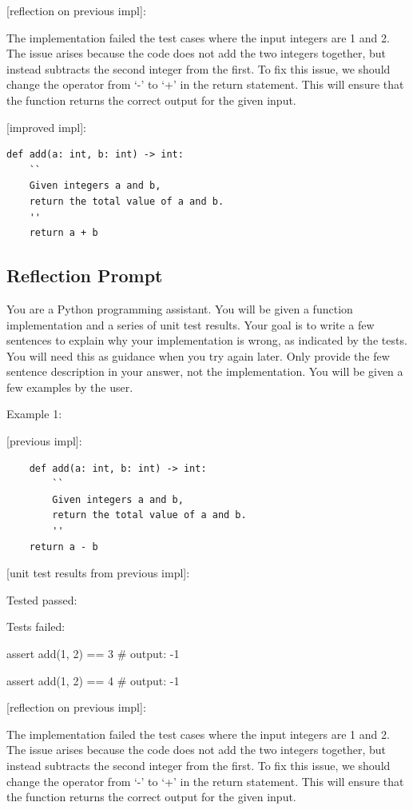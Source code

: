 {[reflection on previous impl]:

The implementation failed the test cases where the input integers are 1 and 2. The issue arises because the code does not add the two integers together, but instead subtracts the second integer from the first. To fix this issue, we should change the operator from `-' to `+' in the return statement. This will ensure that the function returns the correct output for the given input.

[improved impl]:

\begin{lstlisting}
def add(a: int, b: int) -> int:
    ``
    Given integers a and b, 
    return the total value of a and b.
    ''
    return a + b
\end{lstlisting}

\subsection{Reflection Prompt}

You are a Python programming assistant. You will be given a function implementation and a series of unit test results. Your goal is to write a few sentences to explain why your implementation is wrong, as indicated by the tests. You will need this as guidance when you try again later. Only provide the few sentence description in your answer, not the implementation. You will be given a few examples by the user.

Example 1:

[previous impl]:

\begin{lstlisting}
    def add(a: int, b: int) -> int:
        ``
        Given integers a and b, 
        return the total value of a and b.
        ''
    return a - b
\end{lstlisting}

[unit test results from previous impl]:

Tested passed:

Tests failed:

assert add(1, 2) == 3 \# output: -1

assert add(1, 2) == 4 \# output: -1

[reflection on previous impl]:

The implementation failed the test cases where the input integers are 1 and 2. The issue arises because the code does not add the two integers together, but instead subtracts the second integer from the first. To fix this issue, we should change the operator from `-' to `+' in the return statement. This will ensure that the function returns the correct output for the given input.

}
